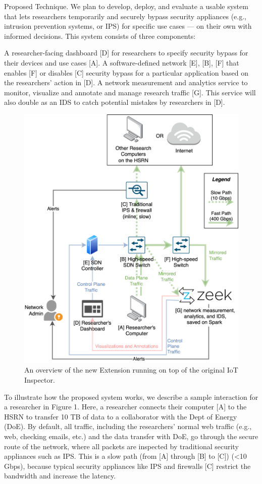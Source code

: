 Proposed Technique. We plan to develop, deploy, and evaluate a usable system that lets researchers temporarily and securely bypass security appliances (e.g., intrusion prevention systems, or IPS) for specific use cases — on their own with informed decisions. This system consists of three components:

A researcher-facing dashboard [D] for researchers to specify security bypass for their devices and use cases [A].
A software-defined network [E], [B], [F] that enables [F] or disables [C] security bypass for a particular application based on the researchers’ action in [D].
A network measurement and analytics service to monitor, visualize and annotate and manage research traffic [G]. This service will also double as an IDS to catch potential mistakes by researchers in [D].

\begin{figure}[t]
    \centering
    \includegraphics[width=0.5\linewidth]{figures/system.png}
    \caption{An overview of the new Extension running on top of the original IoT Inspector.}
    \label{fig:extension}
    \vspace{-0.5cm}
\end{figure}

To illustrate how the proposed system works, we describe a sample interaction for a researcher in Figure 1. Here, a researcher connects their computer [A] to the HSRN to transfer 10 TB of data to a collaborator with the Dept of Energy (DoE). By default, all traffic, including the researchers’ normal web traffic (e.g., web, checking emails, etc.) and the data transfer with DoE, go through the secure route of the network, where all packets are inspected by traditional security appliances such as IPS. This is a slow path (from [A] through [B] to [C]) (<10 Gbps), because  typical security appliances like IPS and firewalls [C] restrict the bandwidth and increase the latency.

